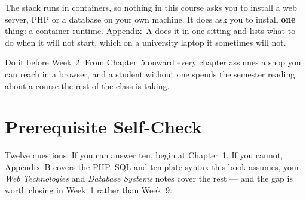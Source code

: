 \begin{alertbox}
The stack runs in containers, so nothing in this course asks you to install a
web server, PHP or a database on your own machine. It does ask you to install
\textbf{one} thing: a container runtime. Appendix~A does it in one sitting and
lists what to do when it will not start, which on a university laptop it
sometimes will not.

\smallskip
Do it before Week~2. From Chapter~5 onward every chapter assumes a shop you can
reach in a browser, and a student without one spends the semester reading about
a course the rest of the class is taking.
\end{alertbox}

\newpage

\chapter*{Prerequisite Self-Check}

Twelve questions. If you can answer ten, begin at Chapter~1. If you cannot,
Appendix~B covers the PHP, SQL and template syntax this book assumes, your
\emph{Web Technologies} and \emph{Database Systems} notes cover the rest --- and
the gap is worth closing in Week~1 rather than Week~9.

